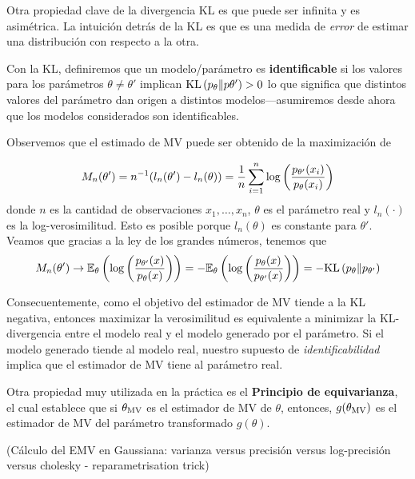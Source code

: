  Otra propiedad clave de la divergencia KL es que puede ser infinita y es asimétrica. La intuición detrás de la KL es que es una medida de \textit{error} de estimar una distribución con respecto a la otra. 

 Con la KL, definiremos que un modelo/parámetro es \textbf{identificable} si los valores para los parámetros $\theta\neq\theta'$ implican $\text{KL}\left(p_\theta\middle\|p\theta'\right)>0$ lo que significa que distintos valores del parámetro dan origen a distintos modelos---asumiremos desde ahora que los modelos considerados son identificables.

Observemos que el estimado de MV puede ser obtenido de la maximización de

\begin{equation}
 	M_n (\theta') = n^{-1} (l_n(\theta') - l_n(\theta))  = \frac{1}{n} \sum_{i=1}^n \log\left(\frac{p_{\theta'}(x_i)}{p_{\theta}(x_i)}\right)
 \end{equation} 
 donde $n$ es la cantidad de observaciones $x_1,\ldots,x_n$, $\theta$ es el parámetro real y $l_n(\cdot)$ es la log-verosimilitud. Esto es posible porque $l_n(\theta)$ es constante para $\theta'$. Veamos que gracias a la ley de los grandes números, tenemos que 
 \begin{equation}
 	M_n(\theta') \rightarrow \mathbb{E}_\theta \left(\log\left(\frac{p_{\theta'}(x)}{p_{\theta}(x)}\right)\right) = -\mathbb{E}_\theta \left(\log\left(\frac{p_{\theta}(x)}{p_{\theta'}(x)}\right)\right) = -\text{KL}\left(p_\theta\middle\|p_{\theta'}\right)
 \end{equation}

 Consecuentemente, como el objetivo del estimador de MV tiende a la KL negativa, entonces maximizar la verosimilitud es equivalente a minimizar la KL-divergencia entre el modelo real y el modelo generado por el parámetro. Si el modelo generado tiende al modelo real, nuestro supuesto de \textit{identificabilidad} implica que el estimador de MV tiene al parámetro real. 

 Otra propiedad muy utilizada en la práctica es el \textbf{Principio de equivarianza}, el cual establece que si ${\theta_\text{MV}}$ es el estimador de MV de $\theta$, entonces, $g({\theta_\text{MV}})$ es el estimador de MV del parámetro transformado $g(\theta)$.

\begin{example}(Cálculo del EMV en Gaussiana: varianza versus precisión versus log-precisión versus cholesky - reparametrisation trick)
	
\end{example}


